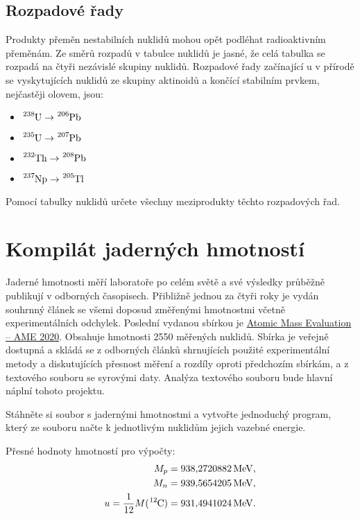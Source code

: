 \documentclass[a4paper,12pt,oneside]{article}
\def\unit#1{\,\mathrm{#1}}
\def\c{,\!}                             %
\theoremstyle{red}
\begin{document}
    \subsection{Rozpadové řady}
        Produkty přeměn nestabilních nuklidů mohou opět podléhat radioaktivním přeměnám.
        Ze směrů rozpadů v tabulce nuklidů je jasné, že celá tabulka se rozpadá na čtyři nezávislé skupiny nuklidů.
        Rozpadové řady začínající u v přírodě se vyskytujících nuklidů ze skupiny aktinoidů a končící stabilním prvkem, nejčastěji olovem, jsou:
        \begin{itemize}
            \item $\ce{^{238}U}\rightarrow\ce{^{206}Pb}$
            \item $\ce{^{235}U}\rightarrow\ce{^{207}Pb}$
            \item $\ce{^{232}Th}\rightarrow\ce{^{208}Pb}$
            \item $\ce{^{237}Np}\rightarrow\ce{^{205}Tl}$
        \end{itemize}
        \begin{task}
            Pomocí tabulky nuklidů určete všechny meziprodukty těchto rozpadových řad.
        \end{task}

\section{Kompilát jaderných hmotností}
    Jaderné hmotnosti měří laboratoře po celém světě a své výsledky průběžně publikují v odborných časopisech.
    Přibližně jednou za čtyři roky je vydán souhrnný článek se všemi doposud změřenými hmotnostmi včetně experimentálních odchylek.
    Poslední vydanou sbírkou je \href{https://www-nds.iaea.org/amdc/}{Atomic Mass Evaluation -- AME 2020}.
    Obsahuje hmotnosti 2550 měřených nuklidů.
    Sbírka je veřejně dostupná a skládá se z odborných článků shrnujících použité experimentální metody a diskutujících přesnost měření a rozdíly oproti předchozím sbírkám, a z textového souboru se syrovými daty.
    Analýza textového souboru bude hlavní náplní tohoto projektu.

    \begin{task}
        Stáhněte si soubor s jadernými hmotnostmi a vytvořte jednoduchý program, který ze souboru načte k jednotlivým nuklidům jejich vazebné energie.
    \end{task}

    Přesné hodnoty hmotností pro výpočty:
    \begin{align}
        M_{p}&=938\c2720882\unit{MeV},\\
        M_{n}&=939\c5654205\unit{MeV},\\
        u=\frac{1}{12}M(\ce{^{12}C})&=931\c4941024\unit{MeV}.
    \end{align}
\end{document}
